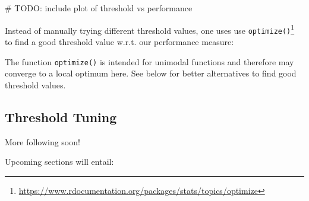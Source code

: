 \documentclass[12pt,]{scrbook}
\makeatletter
\newenvironment{Shaded}{}{}
\newcommand{\AlertTok}[1]{\textcolor[rgb]{1.00,0.00,0.00}{#1}}
\newcommand{\CommentTok}[1]{\textcolor[rgb]{0.00,0.50,0.00}{#1}}
\newcommand{\ControlFlowTok}[1]{\textcolor[rgb]{0.00,0.00,1.00}{#1}}
\newcommand{\DecValTok}[1]{#1}
\newcommand{\FloatTok}[1]{#1}
\newcommand{\KeywordTok}[1]{\textcolor[rgb]{0.00,0.00,1.00}{#1}}
\newcommand{\NormalTok}[1]{#1}
\newcommand{\OperatorTok}[1]{#1}
\newcommand{\StringTok}[1]{\textcolor[rgb]{0.00,0.50,0.50}{#1}}
\renewcommand{\href}[2]{#2\footnote{\url{#1}}}
\newenvironment{kframe}{%
\medskip{}
\setlength{\fboxsep}{.8em}
 \def\at@end@of@kframe{}%
 \ifinner\ifhmode%
  \def\at@end@of@kframe{\end{minipage}}%
  \begin{minipage}{\columnwidth}%
 \fi\fi%
 \def\FrameCommand##1{\hskip\@totalleftmargin \hskip-\fboxsep
 \colorbox{shadecolor}{##1}\hskip-\fboxsep
     \hskip-\linewidth \hskip-\@totalleftmargin \hskip\columnwidth}%
 \MakeFramed {\advance\hsize-\width
   \@totalleftmargin\z@ \linewidth\hsize
   \@setminipage}}%
 {\par\unskip\endMakeFramed%
 \at@end@of@kframe}
\newenvironment{rmdblock}[1]
  {
  \begin{itemize}
  \renewcommand{\labelitemi}{
    \raisebox{-.7\height}[0pt][0pt]{
      {\setkeys{Gin}{width=3em,keepaspectratio}\texttt{[image: images/\#1]}}
    }
  }
  \setlength{\fboxsep}{1em}
  \begin{kframe}
  \item
  }
  {
  \end{kframe}
  \end{itemize}
  }
\newenvironment{warning}
  {\begin{rmdblock}{warning}}
  {\end{rmdblock}}
\makeatother
\begin{document}
\begin{Shaded}
\begin{Highlighting}[]
\CommentTok{# }\AlertTok{TODO}\CommentTok{: include plot of threshold vs performance}
\end{Highlighting}
\end{Shaded}

Instead of manually trying different threshold values, one uses use \href{https://www.rdocumentation.org/packages/stats/topics/optimize}{\texttt{optimize()}} to find a good threshold value w.r.t. our performance measure:

\begin{Shaded}
\end{Shaded}

\begin{warning}
The function \texttt{optimize()} is intended for unimodal functions and
therefore may converge to a local optimum here. See below for better
alternatives to find good threshold values.
\end{warning}

\hypertarget{threshold-tuning-1}{%
\subsection{Threshold Tuning}\label{threshold-tuning-1}}

More following soon!

Upcoming sections will entail:
\end{document}
